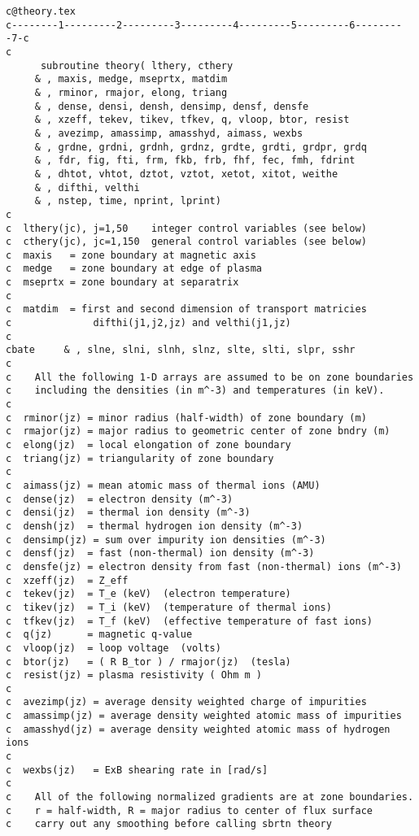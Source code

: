 \begin{verbatim}
c@theory.tex
c--------1---------2---------3---------4---------5---------6---------7-c
c
      subroutine theory( lthery, cthery
     & , maxis, medge, mseprtx, matdim
     & , rminor, rmajor, elong, triang
     & , dense, densi, densh, densimp, densf, densfe
     & , xzeff, tekev, tikev, tfkev, q, vloop, btor, resist
     & , avezimp, amassimp, amasshyd, aimass, wexbs
     & , grdne, grdni, grdnh, grdnz, grdte, grdti, grdpr, grdq
     & , fdr, fig, fti, frm, fkb, frb, fhf, fec, fmh, fdrint
     & , dhtot, vhtot, dztot, vztot, xetot, xitot, weithe
     & , difthi, velthi
     & , nstep, time, nprint, lprint)
c
c  lthery(jc), j=1,50    integer control variables (see below)
c  cthery(jc), jc=1,150  general control variables (see below)
c  maxis   = zone boundary at magnetic axis
c  medge   = zone boundary at edge of plasma
c  mseprtx = zone boundary at separatrix
c
c  matdim  = first and second dimension of transport matricies
c              difthi(j1,j2,jz) and velthi(j1,jz)
c
cbate     & , slne, slni, slnh, slnz, slte, slti, slpr, sshr
c
c    All the following 1-D arrays are assumed to be on zone boundaries
c    including the densities (in m^-3) and temperatures (in keV).
c
c  rminor(jz) = minor radius (half-width) of zone boundary (m)
c  rmajor(jz) = major radius to geometric center of zone bndry (m)
c  elong(jz)  = local elongation of zone boundary
c  triang(jz) = triangularity of zone boundary
c
c  aimass(jz) = mean atomic mass of thermal ions (AMU)
c  dense(jz)  = electron density (m^-3)
c  densi(jz)  = thermal ion density (m^-3)
c  densh(jz)  = thermal hydrogen ion density (m^-3)
c  densimp(jz) = sum over impurity ion densities (m^-3)
c  densf(jz)  = fast (non-thermal) ion density (m^-3)
c  densfe(jz) = electron density from fast (non-thermal) ions (m^-3)
c  xzeff(jz)  = Z_eff
c  tekev(jz)  = T_e (keV)  (electron temperature)
c  tikev(jz)  = T_i (keV)  (temperature of thermal ions)
c  tfkev(jz)  = T_f (keV)  (effective temperature of fast ions)
c  q(jz)      = magnetic q-value
c  vloop(jz)  = loop voltage  (volts)
c  btor(jz)   = ( R B_tor ) / rmajor(jz)  (tesla)
c  resist(jz) = plasma resistivity ( Ohm m )
c
c  avezimp(jz) = average density weighted charge of impurities
c  amassimp(jz) = average density weighted atomic mass of impurities
c  amasshyd(jz) = average density weighted atomic mass of hydrogen ions
c
c  wexbs(jz)   = ExB shearing rate in [rad/s]
c
c    All of the following normalized gradients are at zone boundaries.
c    r = half-width, R = major radius to center of flux surface
c    carry out any smoothing before calling sbrtn theory

\end{verbatim}
